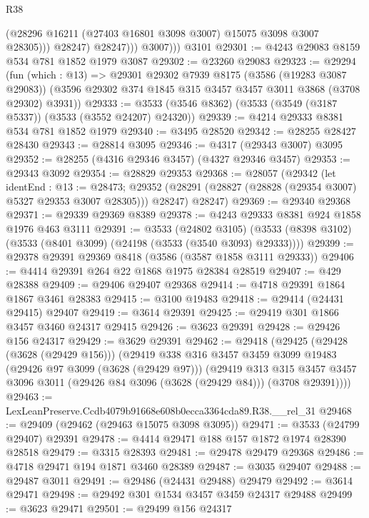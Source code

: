 \begin{lexlean}{R38}
\begin{coremodule}
                    (@28296 @16211 (@27403 @16801 @3098 @3007) @15075 @3098 @3007 @28305)))
                @28247)
              @28247)))
          @3007)))
    @3101
@29301 := @4243 @29083 @8159 @534 @781 @1852 @1979 @3087
@29302 := @23260 @29083
@29323 := @29294
    (fun (which : @13) =>
    @29301
      @29302
      @7939
      @8175
      (@3586 (@19283 @3087 @29083))
      (@3596 @29302 @374 @1845 @315 @3457 @3457 @3011 @3868 (@3708 @29302) @3931))
@29333 := @3533 (@3546 @8362) (@3533 (@3549 (@3187 @5337)) (@3533 (@3552 @24207) @24320))
@29339 := @4214 @29333 @8381 @534 @781 @1852 @1979
@29340 := @3495 @28520
@29342 := @28255 @28427 @28430
@29343 := @28814 @3095
@29346 := @4317 (@29343 @3007) @3095
@29352 := @28255 (@4316 @29346 @3457) (@4327 @29346 @3457)
@29353 := @29343 @3092
@29354 := @28829 @29353
@29368 := @28057
    (@29342
      (let identEnd : @13 := @28473;
      @29352 (@28291 (@28827 (@28828 (@29354 @3007) @5327 @29353 @3007 @28305))) @28247)
      @28247)
@29369 := @29340 @29368
@29371 := @29339 @29369 @8389
@29378 := @4243 @29333 @8381 @924 @1858 @1976 @463 @3111
@29391 := @3533
    (@24802 @3105)
    (@3533 (@8398 @3102) (@3533 (@8401 @3099) (@24198 (@3533 (@3540 @3093) @29333))))
@29399 := @29378 @29391 @29369 @8418 (@3586 (@3587 @1858 @3111 @29333))
@29406 := @4414 @29391 @264 @22 @1868 @1975 @28384 @28519
@29407 := @429 @28388
@29409 := @29406 @29407 @29368
@29414 := @4718 @29391 @1864 @1867 @3461 @28383
@29415 := @3100 @19483
@29418 := @29414 (@24431 @29415) @29407
@29419 := @3614 @29391
@29425 := @29419 @301 @1866 @3457 @3460 @24317 @29415
@29426 := @3623 @29391
@29428 := @29426 @156 @24317
@29429 := @3629 @29391
@29462 := @29418
    (@29425
      (@29428 (@3628 (@29429 @156)))
      (@29419
        @338
        @316
        @3457
        @3459
        @3099
        @19483
        (@29426 @97 @3099 (@3628 (@29429 @97)))
        (@29419
          @313
          @315
          @3457
          @3457
          @3096
          @3011
          (@29426 @84 @3096 (@3628 (@29429 @84)))
          (@3708 @29391))))
@29463 := LexLeanPreserve.Ccdb4079b91668e608b0ecca3364cda89.R38.__rel_31
@29468 := @29409 (@29462 (@29463 @15075 @3098 @3095))
@29471 := @3533 (@24799 @29407) @29391
@29478 := @4414 @29471 @188 @157 @1872 @1974 @28390 @28518
@29479 := @3315 @28393
@29481 := @29478 @29479 @29368
@29486 := @4718 @29471 @194 @1871 @3460 @28389
@29487 := @3035 @29407
@29488 := @29487 @3011
@29491 := @29486 (@24431 @29488) @29479
@29492 := @3614 @29471
@29498 := @29492 @301 @1534 @3457 @3459 @24317 @29488
@29499 := @3623 @29471
@29501 := @29499 @156 @24317

\end{coremodule}
\end{lexlean}
